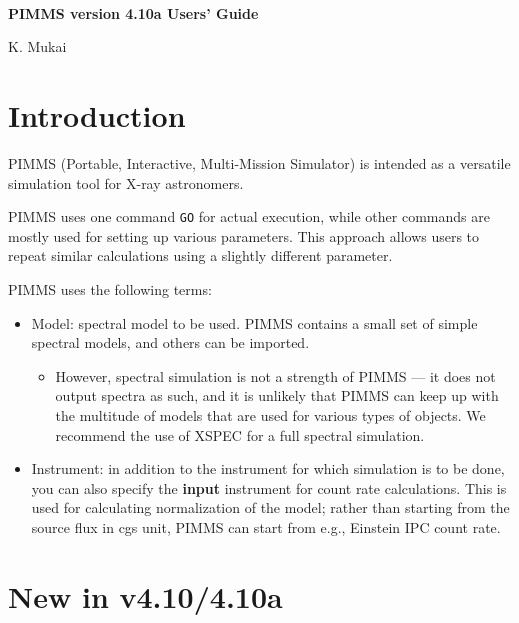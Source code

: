 \documentclass[11pt]{article}
\begin{document}
%
\

\vspace{0.5 cm}
\begin{centering}

{\Large\bf
PIMMS version 4.10a Users' Guide \\
}

\vspace{0.5 cm}

{\Large

K. Mukai \\

}

\end{centering}

\section{Introduction}

PIMMS (Portable, Interactive, Multi-Mission Simulator) is intended
as a versatile simulation tool for X-ray astronomers.

PIMMS uses one command {\tt GO} for actual execution, while other commands
are mostly used for setting up various parameters.  This approach allows
users to repeat similar calculations using a slightly different parameter.

PIMMS uses the following terms:

\begin{itemize}
\item Model: spectral model to be used.  PIMMS contains a small set of
simple spectral models, and others can be imported.
	\begin{itemize}
	\item However, spectral simulation is not a strength of PIMMS
	--- it does not output spectra as such, and it is unlikely that
	PIMMS can keep up with the multitude of models that are used for
	various types of objects.  We recommend
	the use of XSPEC for a full spectral simulation.
	\end{itemize}
\item Instrument: in addition to the instrument for which simulation is
to be done, you can also specify the {\bf input} instrument
for count rate calculations.
This is used for calculating normalization of the model; rather
than starting from the source flux in cgs unit, PIMMS can start from e.g.,
Einstein IPC count rate.  
\end{itemize}

\section{New in v4.10/4.10a}
\end{document}
